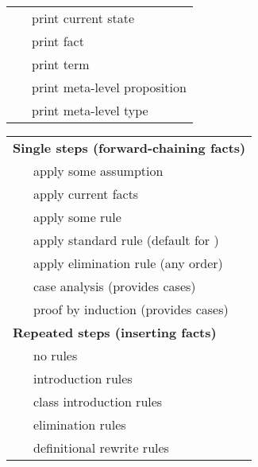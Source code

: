 \begin{isabellebody}
\begin{isamarkuptext}
\end{isamarkuptext}%
\isamarkuptrue%
%
\isamarkuptrue%
%
\begin{isamarkuptext}%
\begin{tabular}{ll}
    \mbox{\isa{\isacommand{pr}}} & print current state \\
    \mbox{\isa{\isacommand{thm}}}~\isa{a} & print fact \\
    \mbox{\isa{\isacommand{term}}}~\isa{t} & print term \\
    \mbox{\isa{\isacommand{prop}}}~\isa{{\isasymphi}} & print meta-level proposition \\
    \mbox{\isa{\isacommand{typ}}}~\isa{{\isasymtau}} & print meta-level type \\
  \end{tabular}%
\end{isamarkuptext}%
\isamarkuptrue%
%
\isamarkuptrue%
%
\begin{isamarkuptext}%
\begin{tabular}{ll}
    \multicolumn{2}{l}{\textbf{Single steps (forward-chaining facts)}} \\[0.5ex]
    \mbox{\isa{assumption}} & apply some assumption \\
    \mbox{\isa{this}} & apply current facts \\
    \mbox{\isa{rule}}~\isa{a} & apply some rule  \\
    \mbox{\isa{rule}} & apply standard rule (default for \mbox{\isa{\isacommand{proof}}}) \\
    \mbox{\isa{contradiction}} & apply \isa{{\isachardoublequote}{\isasymnot}{\isachardoublequote}} elimination rule (any order) \\
    \mbox{\isa{cases}}~\isa{t} & case analysis (provides cases) \\
    \mbox{\isa{induct}}~\isa{x} & proof by induction (provides cases) \\[2ex]

    \multicolumn{2}{l}{\textbf{Repeated steps (inserting facts)}} \\[0.5ex]
    \mbox{\isa{{\isacharminus}}} & no rules \\
    \mbox{\isa{intro}}~\isa{a} & introduction rules \\
    \mbox{\isa{intro{\isacharunderscore}classes}} & class introduction rules \\
    \mbox{\isa{elim}}~\isa{a} & elimination rules \\
    \mbox{\isa{unfold}}~\isa{a} & definitional rewrite rules \\[2ex]


\end{tabular}
\end{isamarkuptext}
\end{isabellebody}
